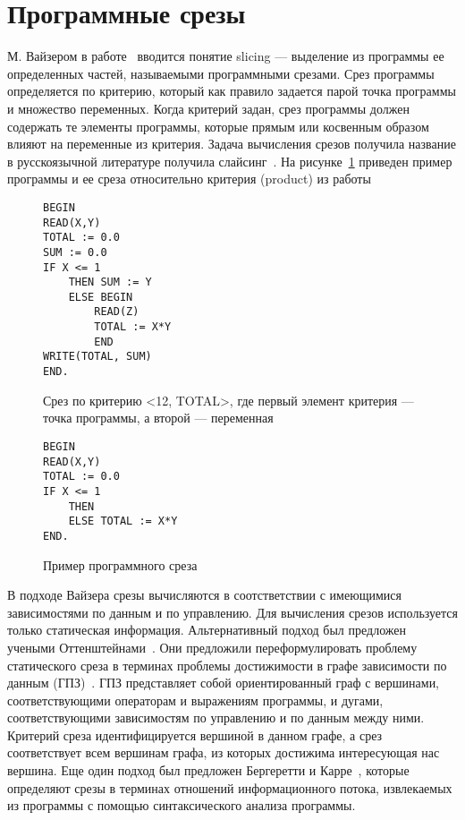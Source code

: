 \section{Программные срезы}
М. Вайзером в работе~\cite{weiser1981program} вводится понятие slicing --- выделение из программы ее определенных частей, называемыми программными срезами. Срез программы определяется по критерию, который как правило задается парой точка программы и множество переменных. Когда критерий задан, срез программы должен содержать те элементы программы, которые прямым или косвенным образом влияют на переменные из критерия. Задача вычисления срезов получила название в русскоязычной литературе получила слайсинг~\cite{2002slicing}. На рисунке~\ref{ex:slice} приведен пример программы и ее среза относительно критерия (product) из работы~\cite{weiser1981program}
\begin{figure}[]
\begin{lstlisting}
BEGIN
READ(X,Y)
TOTAL := 0.0
SUM := 0.0
IF X <= 1
	THEN SUM := Y
	ELSE BEGIN
		READ(Z)
		TOTAL := X*Y
		END
WRITE(TOTAL, SUM)
END.
\end{lstlisting}
Срез по критерию <12, {TOTAL}>, где первый элемент критерия --- точка программы, а второй --- переменная
\begin{lstlisting}
BEGIN
READ(X,Y)
TOTAL := 0.0
IF X <= 1
	THEN 
	ELSE TOTAL := X*Y
END.
\end{lstlisting}
\caption{Пример программного среза}
\label{ex:slice}
\end{figure}
В подходе Вайзера срезы вычисляются в соотстветствии с имеющимися зависимостями по данным и по управлению. Для вычисления срезов используется только статическая информация. Альтернативный подход был предложен учеными Оттенштейнами~\cite{ottenstein1984program}. Они предложили переформулировать проблему статического среза в терминах проблемы достижимости в графе зависимости по данным (ГПЗ)~\cite{ferrante1987program}. ГПЗ представляет собой ориентированный граф с вершинами, соответствующими операторам и выражениям программы, и дугами, соответствующими зависимостям по управлению и по данным между ними. Критерий среза идентифицируется вершиной в данном графе, а срез соответствует всем вершинам графа, из которых достижима интересующая нас вершина. Еще один подход был предложен Бергеретти и Карре~\cite{bergeretti1985information}, которые определяют срезы в терминах отношений информационного потока, извлекаемых из программы с помощью синтаксического анализа программы. 

